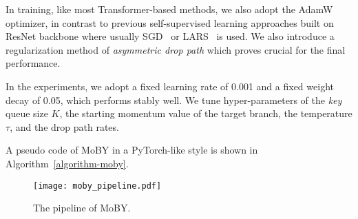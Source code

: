 \documentclass{article}
\begin{document}
In training, like most Transformer-based methods, we also adopt the AdamW~\citep{adam,adamw} optimizer, in contrast to previous self-supervised learning approaches built on ResNet backbone where usually SGD~\citep{moco,pic} or LARS~\citep{simclr,byol,pixpro} is used. We also introduce a regularization method of \emph{asymmetric drop path} which proves crucial for the final performance.

In the experiments, we adopt a fixed learning rate of 0.001 and a fixed weight decay of 0.05, which performs stably well. We tune hyper-parameters of the \emph{key} queue size $K$, the starting momentum value of the target branch, the temperature $\tau$, and the drop path rates. 

A pseudo code of MoBY in a PyTorch-like style is shown in Algorithm~\ref{algorithm-moby}.

\begin{figure}[h]
\centering
\texttt{[image: moby\_pipeline.pdf]}
\caption{The pipeline of MoBY.}
\label{fig-moby}
\end{figure}
\end{document}
